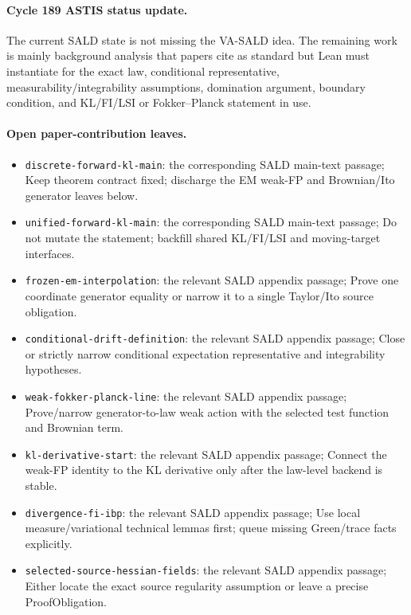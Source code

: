 \paragraph{Cycle 189 ASTIS status update.}
The current SALD state is not missing the VA-SALD idea.  The remaining work is mainly background analysis that papers cite as standard but Lean must instantiate for the exact law, conditional representative, measurability/integrability assumptions, domination argument, boundary condition, and KL/FI/LSI or Fokker--Planck statement in use.

\paragraph{Open paper-contribution leaves.}
\begin{itemize}
\item \texttt{discrete-forward-kl-main}: the corresponding SALD main-text passage; Keep theorem contract fixed; discharge the EM weak-FP and Brownian/Ito generator leaves below.
\item \texttt{unified-forward-kl-main}: the corresponding SALD main-text passage; Do not mutate the statement; backfill shared KL/FI/LSI and moving-target interfaces.
\item \texttt{frozen-em-interpolation}: the relevant SALD appendix passage; Prove one coordinate generator equality or narrow it to a single Taylor/Ito source obligation.
\item \texttt{conditional-drift-definition}: the relevant SALD appendix passage; Close or strictly narrow conditional expectation representative and integrability hypotheses.
\item \texttt{weak-fokker-planck-line}: the relevant SALD appendix passage; Prove/narrow generator-to-law weak action with the selected test function and Brownian term.
\item \texttt{kl-derivative-start}: the relevant SALD appendix passage; Connect the weak-FP identity to the KL derivative only after the law-level backend is stable.
\item \texttt{divergence-fi-ibp}: the relevant SALD appendix passage; Use local measure/variational technical lemmas first; queue missing Green/trace facts explicitly.
\item \texttt{selected-source-hessian-fields}: the relevant SALD appendix passage; Either locate the exact source regularity assumption or leave a precise ProofObligation.
\end{itemize}

